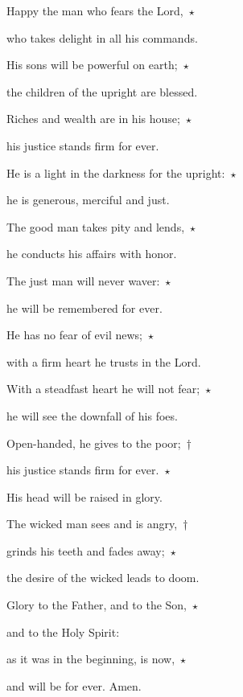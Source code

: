 \noindent Happy the man who fears the Lord,~$\star$~\nopagebreak

who takes delight in all his commands.

\noindent His sons will be powerful on earth;~$\star$~\nopagebreak

the children of the upright are blessed.

\noindent Riches and wealth are in his house;~$\star$~\nopagebreak

his justice stands firm for ever.

\noindent He is a light in the darkness for the upright:~$\star$~\nopagebreak

he is generous, merciful and just.

\noindent The good man takes pity and lends,~$\star$~\nopagebreak

he conducts his affairs with honor.

\noindent The just man will never waver:~$\star$~\nopagebreak

he will be remembered for ever.

\noindent He has no fear of evil news;~$\star$~\nopagebreak

with a firm heart he trusts in the Lord.

\noindent With a steadfast heart he will not fear;~$\star$~\nopagebreak

he will see the downfall of his foes.

\noindent Open-handed, he gives to the poor;~†~\nopagebreak

his justice stands firm for ever.~$\star$~\nopagebreak

His head will be raised in glory.

\noindent The wicked man sees and is angry,~†~\nopagebreak

grinds his teeth and fades away;~$\star$~\nopagebreak

the desire of the wicked leads to doom.

\noindent Glory to the Father, and to the Son,~$\star$~\nopagebreak

and to the Holy Spirit:

\noindent as it was in the beginning, is now,~$\star$~\nopagebreak

and will be for ever. Amen.
